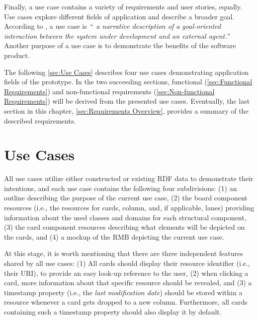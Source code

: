 \noindent Finally, a use case contains a variety of requirements and user stories, equally. Use cases explore different fields of application and describe a broader goal. According to \textcite{Burris}, a use case is \textit{``\textellipsis{}~a narrative description of a goal-oriented interaction between the system under development and an external agent.''} Another purpose of a use case is to demonstrate the benefits of the software product.

The following \autoref{sec:Use Cases} describes four use cases demonstrating application fields of the prototype. In the two succeeding sections, functional (\autoref{sec:Functional Requirements}) and non-functional requirements (\autoref{sec:Non-functional Requirements}) will be derived from the presented use cases. Eventually, the last section in this chapter, \autoref{sec:Requirements Overview}, provides a summary of the described requirements. 




\section{Use Cases}\label{sec:Use Cases}

All use cases utilize either constructed or existing \acrshort*{RDF} data to demonstrate their intentions, and each use case contains the following four subdivisions: (1) an outline describing the purpose of the current use case, (2) the board component resources (i.e., the resources for cards, column, and, if applicable, lanes) providing information about the used classes and domains for each structural component, (3) the card component resources describing what elements will be depicted on the cards, and (4) a mockup of the \acrshort*{RMB} depicting the current use case.

At this stage, it is worth mentioning that there are three independent features shared by all use cases: (1) All cards should display their resource identifier (i.e., their \acrshort*{URI}), to provide an easy look-up reference to the user, (2) when clicking a card, more information about that specific resource should be revealed, and (3) a timestamp property (i.e., the \textit{last modification date}) should be stored within a resource whenever a card gets dropped to a new column. Furthermore, all cards containing such a timestamp property should also display it by default.



